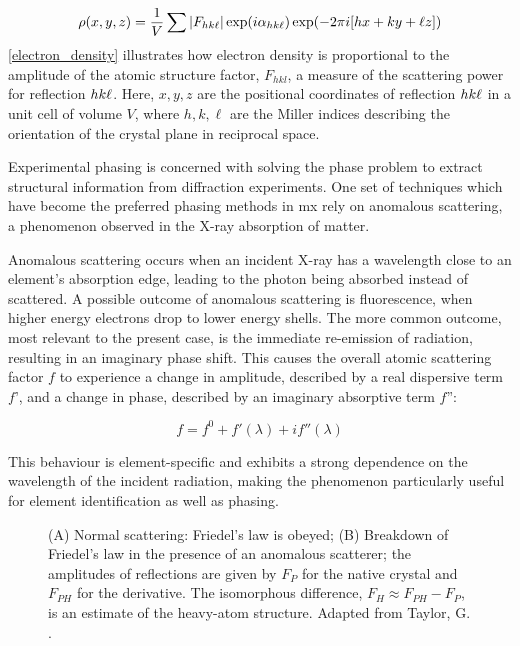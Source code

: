 \begin{equation}
    \rho(x,y,z)=\frac{1}{V} \sum |F_{hk\ell}| \exp(i\alpha_{hk\ell}) \exp(-2\pi i [hx+ky+\ell z]) \label{electron_density}
\end{equation}
\cref{electron_density} illustrates how electron density is proportional to the amplitude of the atomic structure factor, $F_{hkl}$, a measure of the scattering power for reflection $hk\ell$. Here, $x,y,z$ are the positional coordinates of reflection $hk\ell$ in a unit cell of volume $V$, where $h,k,\ell$ are the Miller indices describing the orientation of the crystal plane in reciprocal space. %

Experimental phasing is concerned with solving the phase problem to extract structural information from diffraction experiments. One set of techniques which have become the preferred phasing methods in \ac{mx} rely on anomalous scattering, a phenomenon observed in the X-ray absorption of matter.

Anomalous scattering occurs when an incident X-ray has a wavelength close to an element’s absorption edge, leading to the photon being absorbed instead of scattered. A possible outcome of anomalous scattering is fluorescence, when higher energy electrons drop to lower energy shells. The more common outcome, most relevant to the present case, is the immediate re-emission of radiation, resulting in an imaginary phase shift. This causes the overall atomic scattering factor $f$ to experience a change in amplitude, described by a real dispersive term $f’$, and a change in phase, described by an imaginary absorptive term $f”$:

\begin{equation}
    f=f^0+f'(\lambda)+if''(\lambda) \label{total scattering}
\end{equation}

This behaviour is element-specific and exhibits a strong dependence on the wavelength of the incident radiation, making the phenomenon particularly useful for element identification as well as phasing.

\begin{figure}
    \centering
    
    \caption{(A) Normal scattering: Friedel's law is obeyed; (B) Breakdown of Friedel's law in the presence of an anomalous scatterer; the amplitudes of reflections are given by $F_P$ for the native crystal and $F_{PH}$ for the derivative. The isomorphous difference, $F_H \approx F_{PH} - F_P$, is an estimate of the heavy-atom structure. Adapted from Taylor, G. \cite{Taylor2003}.}
    \label{Breakdown of Friedel's law}
\end{figure}

